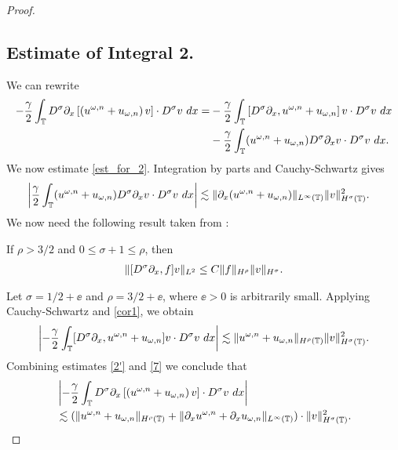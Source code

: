 \begin{proof}
\subsection*{Estimate of Integral 2.} We can rewrite
%
%
\begin{equation}
\begin{split}
-\frac{\gamma}{2} \int_{\mathbb{T}} D^\sigma \partial_x \left[ \left( u^{\omega,n} + 
u_{\omega,n}
\right)v \right] \cdot D^\sigma v \ dx
= & -\frac{\gamma}{2}\int_{\mathbb{T}} \left[ D^\sigma \partial_x , u^{\omega,n} + 
u_{\omega,n}
\right]v \cdot D^\sigma v \ dx
\\
& - \frac{\gamma}{2} \int_{\mathbb{T}} (u^{\omega,n} + u_{\omega,n})
D^\sigma \partial_x v \cdot
D^\sigma v \ dx.
\label{est_for_2}
\end{split}
\end{equation}
%
%
We now estimate \eqref{est_for_2}. Integration 
by parts and Cauchy-Schwartz gives 
%
%
\begin{equation}
\begin{split}
\left | \frac{\gamma}{2} \int_{\mathbb{T}} (u^{\omega,n} + u_{\omega,n})
D^\sigma \partial_x v \cdot
D^\sigma v \ dx \right |
& \lesssim \|\partial_x(u^{\omega,n} + u_{\omega,n}) \|_{L^\infty(\mathbb{T})}
\|v\|_{H^\sigma(\mathbb{T})}^2.
\label{2'}
\end{split}
\end{equation}
%
%
We now need the following result
taken from \cite{Himonas:2010}:
%
\begin{lemma}
\label{cor1}
If $\rho > 3/2$ and $0 \le \sigma + 1 \le \rho$, then
%
%
\begin{equation}
\begin{split}
\|[D^\sigma \partial_x ,f]v\|_{L^2} \le C \|f\|_{H^\rho} \|v\|_{H^\sigma}.
\label{15}
\end{split}
\end{equation}
%
%
\end{lemma}
%
Let $\sigma = 1/2 + \ee$ and $\rho = 3/2 + \ee$, where 
$\ee > 0$ is
arbitrarily small. Applying Cauchy-Schwartz and \cref{cor1}, we obtain 
%
%
%
%
%
\begin{equation}
\begin{split}
\left | -\frac{\gamma}{2} \int_{\mathbb{T}} [D^\sigma \partial_x , u^{\omega,n} + 
u_{\omega,n}]v
\cdot D^\sigma v \ dx \right | \lesssim \|u^{\omega,n} +
u_{\omega,n}\|_{H^{\rho}(\mathbb{T})} \|v\|_{H^\sigma(\mathbb{T})}^2.
\label{7}
\end{split}
\end{equation}
%
%
Combining estimates \eqref{2'} and \eqref{7} we conclude that
%
%
\begin{equation}
\begin{split}
& \left | -\frac{\gamma}{2} \int_{\mathbb{T}} D^\sigma \partial_x \left[ \left( 
u^{\omega,n} + u_{\omega,n}
\right)v \right]  \cdot D^\sigma v \ dx \right |
\\
& \lesssim (\|u^{\omega,n} + u_{\omega,n}\|_{H^{\rho}(\mathbb{T})} + \|\partial_x 
u^{\omega,n} +
\partial_x u_{\omega,n}\|_{L^\infty(\mathbb{T})} ) \cdot \|v\|_{H^\sigma(\mathbb{T})}^2.
\label{8}
\end{split}
\end{equation}
%
%
%


\end{proof}
